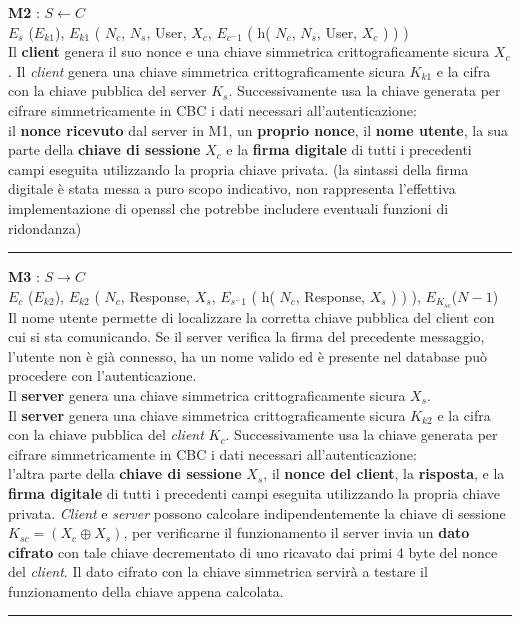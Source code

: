 \documentclass[a4paper,titlepage]{article}
\begin{document}
\begin{center}
\textbf{M2} : $S \leftarrow C$ \\ $E_{s}$ ($E_{k1}$), $E_{k1}$ ( $N_c$, $N_s$, User, $X_c$, $E_{c^-1}$ ( h( $N_c$, $N_s$, User, $X_c$ ) ) ) \\[0.3cm]
Il \textbf{client} genera il suo nonce e una chiave simmetrica crittograficamente sicura $X_c$.
Il \textit{client} genera una chiave simmetrica crittograficamente sicura $K_{k1}$ e la cifra con la chiave pubblica del server $K_{s}$.
Successivamente usa la chiave generata per cifrare simmetricamente in CBC i dati necessari all'autenticazione: \\
il \textbf{nonce ricevuto} dal server in M1, un \textbf{proprio nonce}, il \textbf{nome utente}, la sua parte della \textbf{chiave di sessione} $X_c$ e la \textbf{firma digitale} di tutti i precedenti campi eseguita utilizzando la propria chiave privata. (la sintassi della firma digitale è stata messa a puro scopo indicativo, non rappresenta l'effettiva implementazione di openssl che potrebbe includere eventuali funzioni di ridondanza)\\[0.3cm]
\rule{6cm}{0.4pt}
\end{center}

\begin{center}
\textbf{M3} : $S \rightarrow C$ \\ $E_{c}$ ($E_{k2}$), $E_{k2}$ ( $N_c$, Response, $X_s$, $E_{s^-1}$ ( h( $N_c$, Response, $X_s$ ) ) ), $E_{K_{sc}}$($N-1$)\\[0.3cm]
Il nome utente permette di localizzare la corretta chiave pubblica del client con cui si sta comunicando. Se il server verifica la firma del precedente messaggio, l'utente non è già connesso, ha un nome valido ed è presente nel database può procedere con l'autenticazione.\\
Il \textbf{server} genera una chiave simmetrica crittograficamente sicura $X_s$.\\
Il \textbf{server} genera una chiave simmetrica crittograficamente sicura $K_{k2}$ e la cifra con la chiave pubblica del \textit{client} $K_{c}$. Successivamente usa la chiave generata per cifrare simmetricamente in CBC i dati necessari all'autenticazione:\\
l'altra parte della \textbf{chiave di sessione} $X_s$, il \textbf{nonce del client}, la \textbf{risposta}, e la \textbf{firma digitale} di tutti i precedenti campi eseguita utilizzando la propria chiave privata. \textit{Client} e \textit{server} possono calcolare indipendentemente la chiave di sessione $ K_{sc} = (X_c \oplus X_s)$, per verificarne il funzionamento il server invia un \textbf{dato cifrato} con tale chiave decrementato di uno ricavato dai primi 4 byte del nonce del \textit{client}.
Il dato cifrato con la chiave simmetrica servirà a testare il funzionamento della chiave appena calcolata.\\[0.3cm]
\rule{6cm}{0.4pt}
\end{center}
\end{document}
